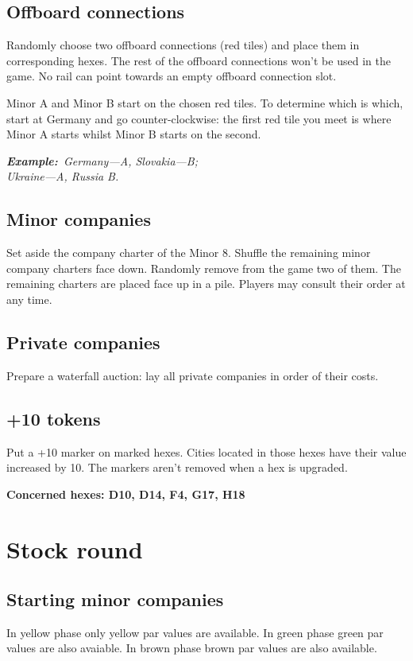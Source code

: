 \documentclass[10pt,a4paper,twocolumn]{article}
\newcommand{\Example}{\textbf{Example:}}
\begin{document}
\subsection{Offboard connections}
Randomly choose two offboard connections (red tiles) and place them in corresponding hexes. The rest of the offboard connections won't be used in the game. No rail can point towards an empty offboard connection slot.

Minor A and Minor B start on the chosen red tiles. To determine which is which, start at Germany and go counter-clockwise: the first red tile you meet is where Minor A starts whilst Minor B starts on the second.

\textit{\Example~Germany—A, Slovakia—B;\\Ukraine—A, Russia B.}

\subsection{Minor companies}
Set aside the company charter of the Minor 8. Shuffle the remaining minor company charters face down. Randomly remove from the game two of them. The remaining charters are placed face up in a pile. Players may consult their order at any time. 

\subsection{Private companies}
Prepare a waterfall auction: lay all private companies in order of their costs.

\subsection{+10 tokens}
Put a +10 marker on marked hexes. Cities located in those hexes have their value increased by 10. The markers aren't removed when a hex is upgraded.

\textbf{Concerned hexes: D10, D14, F4, G17, H18}


\section{Stock round}

\subsection{Starting minor companies}
In yellow phase only yellow par values are available. In green phase green par values are also avaiable. In brown phase brown par values are also available.
\end{document}
